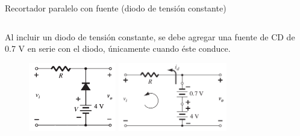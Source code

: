 \documentclass[t,aspectratio=169]{beamer}
\begin{document}
\begin{frame}{Recortador paralelo con fuente (diodo de tensión constante)}

\begin{columns}
\begin{column}{0.75\textwidth}

Al incluir un diodo de tensión constante, se debe agregar una fuente de CD de 0.7 V en serie con el diodo, únicamente cuando éste conduce.

\begin{figure}
    \centering
    \includegraphics[height=3cm]{figures/recortador_serie_ideal_fuente_vcte_circuito_1.png} \hspace{5mm} \includegraphics[height=3cm]{figures/recortador_serie_ideal_fuente_vcte_circuito_2.png}
\end{figure}

\end{column}
\begin{column}{0.25\textwidth}


\end{column}
\end{columns}
\end{frame}
\end{document}
